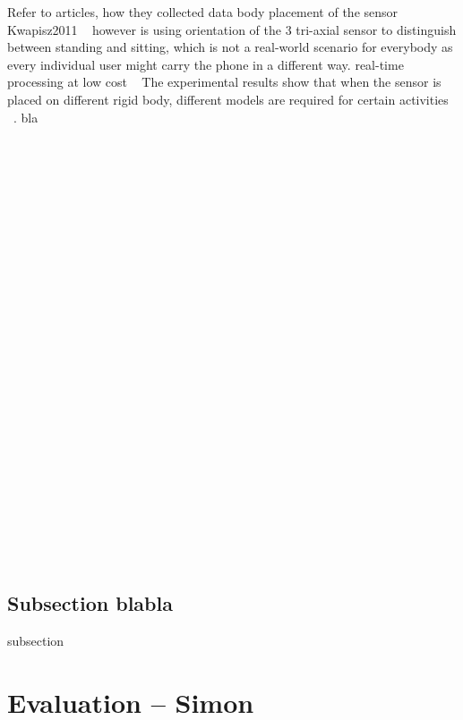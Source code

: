 \documentclass[conference]{IEEEtran}
\begin{document}
Refer to articles, how they collected data
body placement of the sensor
Kwapisz2011 ~\cite{Kwapisz2011} however is using orientation of the 3 tri-axial sensor to distinguish between standing and sitting, which is not a real-world scenario for everybody as every individual user might carry the phone in a different way.
real-time processing at low cost ~\cite{Brezmes2009}
The experimental results show that when the sensor is placed on different rigid body, different models are required for certain activities ~\cite{Henpraserttae2011}.
bla
\\
\\
\\
\\
\\
\\
\\
\\
\\
\\
\\
\\
\\
\\
\\
\\
\\
\\
\\
\\
\\
\\
\\
\\
\\
\\
\subsection{Subsection blabla}
subsection
\newpage
\section{Evaluation -- Simon}
\end{document}

